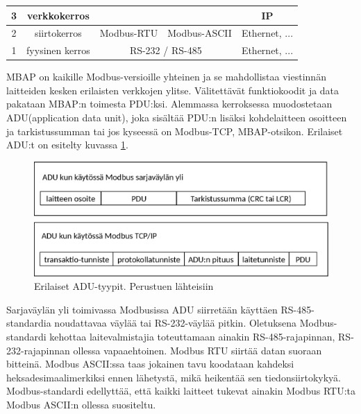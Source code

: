 \begin{table}
\begin{tabular}{|c|c|ccc}
      3                                         & verkkokerros                     &                                                         & \multicolumn{1}{c|}{}                                     & \multicolumn{1}{c|}{IP}                                       \\ \hline
      2                                         & siirtokerros                     & \multicolumn{1}{c|}{\cellcolor[HTML]{6F6FE6}Modbus-RTU} & \multicolumn{1}{c|}{\cellcolor[HTML]{6F6FE6}Modbus-ASCII} & \multicolumn{1}{c|}{Ethernet, ...}                            \\ \hline
      1                                         & fyysinen kerros                  & \multicolumn{2}{c|}{RS-232 / RS-485}                                                                                & \multicolumn{1}{c|}{Ethernet, ...}                            \\ \hline
      \end{tabular}
      \label{rakenne}
    \end{table}

    \gls{MBAP} on kaikille Modbus-versioille yhteinen ja se mahdollistaa viestinnän laitteiden kesken erilaisten verkkojen ylitse. Välitettävät funktiokoodit ja data pakataan \gls{MBAP}:n toimesta PDU:ksi. Alemmassa kerroksessa muodostetaan \gls{ADU}(application data unit), joka sisältää PDU:n lisäksi kohdelaitteen osoitteen ja tarkistussumman tai jos kyseessä on Modbus-TCP, \gls{MBAP}-otsikon. Erilaiset ADU:t on esitelty kuvassa \ref{fig:adu}.
    \begin{figure}[h]
      \centering
      \includegraphics[width=1\textwidth]{figures/adu}
      \caption[ADU-tyypit]{Erilaiset ADU-tyypit.  Perustuen lähteisiin \parencite{modbusTCPIPSpec, modbusSerialSpec}}
      \label{fig:adu}
    \end{figure}

    Sarjaväylän yli toimivassa Modbusissa ADU siirretään käyttäen RS-485-standardia noudattavaa väylää tai RS-232-väylää pitkin. Oletuksena Modbus-standardi kehottaa laitevalmistajia toteuttamaan ainakin RS-485-rajapinnan, RS-232-rajapinnan ollessa vapaaehtoinen. Modbus \gls{RTU} siirtää datan suoraan bitteinä. Modbus \gls{ASCII}:ssa taas jokainen tavu koodataan kahdeksi heksadesimaalimerkiksi ennen lähetystä, mikä heikentää sen tiedonsiirtokykyä. Modbus-standardi edellyttää, että kaikki laitteet tukevat ainakin Modbus RTU:ta Modbus ASCII:n ollessa suositeltu. \parencite{modbusSerialSpec}

